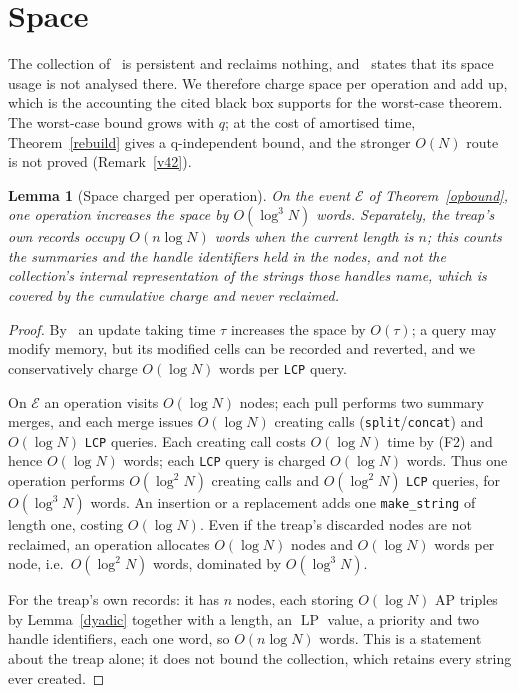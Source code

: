 ﻿\documentclass[11pt]{article}
\theoremstyle{plain}
\newtheorem{lemma}[theorem]{Lemma}
\theoremstyle{remark}
\begin{document}
\section{Space}\label{sec:space}
The collection of~\cite{GKK} is persistent and reclaims nothing, and~\cite[App.~A]{GKK} states that its space usage is not analysed there. We therefore charge space per operation and add up, which is the accounting the cited black box supports for the worst-case theorem. The worst-case bound grows with $q$; at the cost of amortised time, Theorem~\ref{rebuild} gives a q-independent bound, and the stronger $O(N)$ route is not proved (Remark~\ref{v42}).

\begin{lemma}[Space charged per operation]\label{spaceop}
On the event $\mathcal E$ of Theorem~\ref{opbound}, one operation increases the space by $O(\log^3N)$ words. Separately, the treap's own records occupy $O(n\log N)$ words when the current length is $n$; this counts the summaries and the handle identifiers held in the nodes, and not the collection's internal representation of the strings those handles name, which is covered by the cumulative charge and never reclaimed.
\end{lemma}
\begin{proof}
By~\cite[App.~A]{GKK} an update taking time $\tau$ increases the space by $O(\tau)$; a query may modify memory, but its modified cells can be recorded and reverted, and we conservatively charge $O(\log N)$ words per \texttt{LCP} query.

On $\mathcal E$ an operation visits $O(\log N)$ nodes; each pull performs two summary merges, and each merge issues $O(\log N)$ creating calls (\texttt{split}/\texttt{concat}) and $O(\log N)$ \texttt{LCP} queries. Each creating call costs $O(\log N)$ time by (F2) and hence $O(\log N)$ words; each \texttt{LCP} query is charged $O(\log N)$ words. Thus one operation performs $O(\log^2N)$ creating calls and $O(\log^2N)$ \texttt{LCP} queries, for $O(\log^3N)$ words. An insertion or a replacement adds one \texttt{make\_string} of length one, costing $O(\log N)$. Even if the treap's discarded nodes are not reclaimed, an operation allocates $O(\log N)$ nodes and $O(\log N)$ words per node, i.e.\ $O(\log^2N)$ words, dominated by $O(\log^3N)$.

For the treap's own records: it has $n$ nodes, each storing $O(\log N)$ AP triples by Lemma~\ref{dyadic} together with a length, an $\operatorname{LP}$ value, a priority and two handle identifiers, each one word, so $O(n\log N)$ words. This is a statement about the treap alone; it does not bound the collection, which retains every string ever created.
\end{proof}
\end{document}
